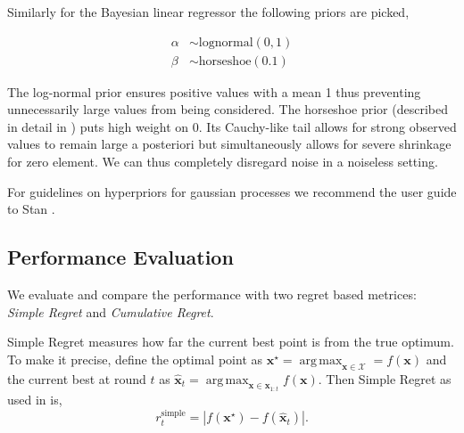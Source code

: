 \documentclass[conference,compsoc]{IEEEtran}
\DeclareMathOperator*{\argmax}{arg\,max}
\theoremstyle{definition}
\begin{document}
        Similarly for the Bayesian linear regressor the following priors are picked,

        \begin{equation}
            \begin{split}
                \alpha & \sim \mathrm{lognormal}(0, 1) \\
                \beta  & \sim \mathrm{horseshoe}(0.1)
            \end{split}
        \end{equation}

        The log-normal prior ensures positive values with a mean 1 thus preventing unnecessarily large values from being considered.
        The horseshoe prior (described in detail in \parencite{carvalho_handling_2009}) puts high weight on 0.
        Its Cauchy-like tail allows for strong observed values to remain large a posteriori but simultaneously allows for severe shrinkage for zero element.
        We can thus completely disregard noise in a noiseless setting.


        For guidelines on hyperpriors for gaussian processes we recommend the user guide to Stan \parencite{stan_development_team_stan_2017}.

    
    \subsection{Performance Evaluation}\label{sec:performance}

        We evaluate and compare the performance with two regret based metrices: \emph{Simple Regret} and \emph{Cumulative Regret}.

        Simple Regret measures how far the current best point is from the true optimum.
        To make it precise, define the optimal point as $\bm{x}^\star = \argmax_{\bm{x}\in \mathcal{X}}=f(\bm{x})$ and the current best at round $t$ as $\hat{\bm{x}}_t = \argmax_{\bm{x} \in \bm{x}_{1:t}} f(\bm{x})$.
        Then Simple Regret as used in \parencite{snoek_scalable_2015, springenberg_bayesian_2016, golovin_google_2017} is,
        \begin{equation}
            r_t^{\mathrm{simple}} = |f(\bm{x}^\star) - f(\hat{\bm{x}}_t)|.
        \end{equation}
        
\end{document}
